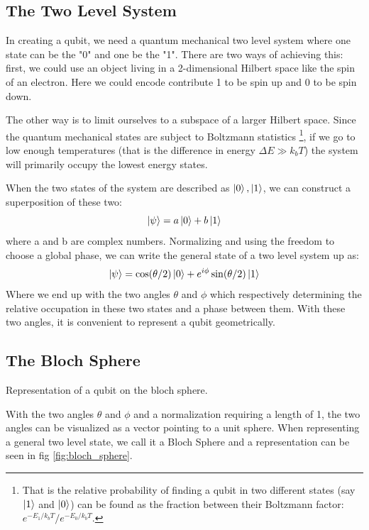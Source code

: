 \subsection{The Two Level System}\label{sec:tls}
In creating a qubit, we need a quantum mechanical two level system where one state can be the "0" and one be the "1". There are two ways of achieving this: first, we could use an object living in a 2-dimensional Hilbert space like the spin of an electron. Here we could encode contribute 1 to be spin up and 0 to be spin down. 

The other way is to limit ourselves to a subspace of a larger Hilbert space. Since the quantum mechanical states are subject to Boltzmann statistics \footnote{That is the relative probability of finding a qubit in two different states (say $\ket{1}$ and $\ket{0}$) can be found as the fraction between their Boltzmann factor: $e^{-E_1 / k_b  T} / e^{- E_0 / k_b  T}$.}, if we go to low enough temperatures (that is the difference in energy $\Delta E \gg k_b T$)  the system will primarily occupy the lowest energy states. 

When the two states of the system are described as $\ket{0}, \ket{1}$, we can construct a superposition of these two:
\begin{equation}
    \ket{\psi} = a \ket{0} + b \ket{1}
\end{equation}
where a and b are complex numbers. Normalizing and using the freedom to choose a global phase, we can write the general state of a two level system up as:
\begin{equation}\label{eq:general_2_state}
    \ket{\psi} = \cos (\theta / 2) \ket{0} + e^{i\phi}\sin(\theta / 2)\ket{1}
\end{equation}
Where we end up with the two angles $\theta$ and $\phi$ which respectively determining the relative occupation in these two states and a phase between them. With these two angles, it is convenient to represent a qubit geometrically.

\subsection{The Bloch Sphere}
\begin{marginfigure}[3 cm]
    \centering
    \caption{Representation of a qubit on the bloch sphere.}
    \label{fig:bloch_sphere}
\end{marginfigure}
With the two angles $\theta$ and $\phi$ and a normalization requiring a length of 1, the two angles can be visualized as a vector pointing to a unit sphere. When representing a general two level state, we call it a Bloch Sphere and a representation can be seen in fig \ref{fig:bloch_sphere}.

